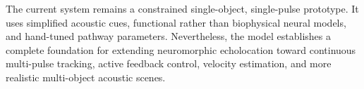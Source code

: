 The current system remains a constrained single-object, single-pulse prototype. It uses simplified acoustic cues, functional rather than biophysical neural models, and hand-tuned pathway parameters. Nevertheless, the model establishes a complete foundation for extending neuromorphic echolocation toward continuous multi-pulse tracking, active feedback control, velocity estimation, and more realistic multi-object acoustic scenes.
